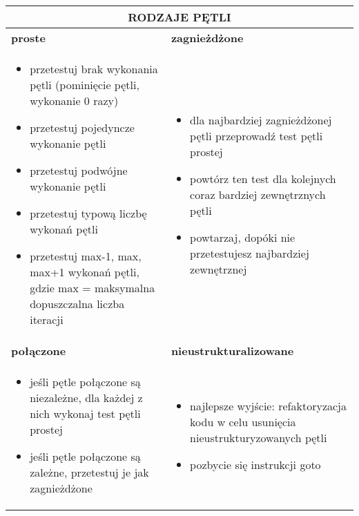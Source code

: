 \documentclass[../main.tex]{subfiles}
\begin{document}
    \begin{table}[H]
        \begin{center}
            \begin{tabular}{| p{8cm} | p{8cm} |}
                \hline
                \multicolumn{2}{|c|}{\textbf{RODZAJE PĘTLI}}\\
                \hline
                \hline
                \textbf{proste} & \textbf{zagnieżdżone}\\
                \hline
                \begin{itemize}
                    \item przetestuj brak wykonania pętli (pominięcie pętli, wykonanie 0 razy)
                    \item przetestuj pojedyncze wykonanie pętli
                    \item przetestuj podwójne wykonanie pętli
                    \item przetestuj typową liczbę wykonań pętli
                    \item przetestuj max-1, max, max+1 wykonań pętli, gdzie max =
                    maksymalna dopuszczalna liczba iteracji
                \end{itemize}
                &
                \begin{itemize}
                    \item dla najbardziej zagnieżdżonej pętli przeprowadź test pętli prostej
                    \item powtórz ten test dla kolejnych coraz bardziej zewnętrznych pętli
                    \item powtarzaj, dopóki nie przetestujesz najbardziej zewnętrznej
                \end{itemize}\\
                \hline
                \hline
                \textbf{połączone} & \textbf{nieustrukturalizowane}\\
                \hline
                \begin{itemize}
                    \item jeśli pętle połączone są niezależne, dla każdej z nich wykonaj test pętli prostej
                    \item jeśli pętle połączone są zależne, przetestuj je jak zagnieżdżone
                \end{itemize}
                &
                \begin{itemize}
                    \item najlepsze wyjście: refaktoryzacja
                    kodu w celu usunięcia
                    nieustrukturyzowanych pętli
                    \item pozbycie się instrukcji goto
                \end{itemize}\\
                \hline
            \end{tabular}
        \end{center}
    \end{table}
\end{document}
